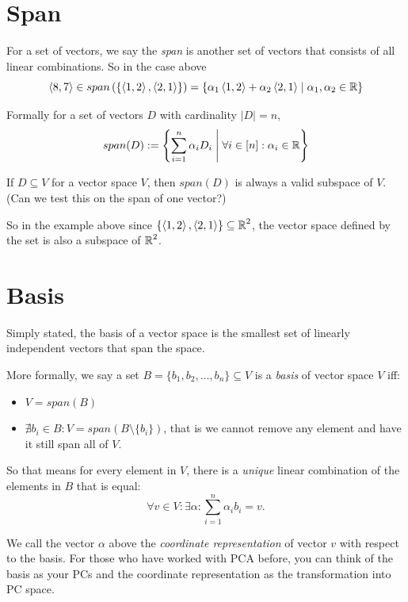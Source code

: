 \section{Span}
For a set of vectors, we say the \emph{span} is another set of vectors that consists of all linear combinations. 
So in the case above
\[
\left\langle8,7\right\rangle \in span\left(\left\{\left\langle1,2\right\rangle,\left\langle2,1\right\rangle\right\}\right) = 
\left\{\alpha_1\left\langle1,2\right\rangle + \alpha_2\left\langle2,1\right\rangle \;\middle|\; \alpha_1,\alpha_2 \in \operatorname{\mathbb{R}}\right\}
\]

Formally for a set of vectors $D$ with cardinality $\left|D\right|=n$, 
\[
span(D) := \left\{\sum_{i=1}^{n} \alpha_iD_i \;\middle|\; \forall i \in \left[n\right]: \alpha_i \in \operatorname{\mathbb{R}} \right\}
\]

If $D\subseteq V$ for a vector space $V$, then $span(D)$ is always a valid subspace of $V$. 
(Can we test this on the span of one vector?)

So in the example above since $\left\{\left\langle1,2\right\rangle,\left\langle2,1\right\rangle\right\}\subseteq\operatorname{\mathbb{R}}^2$,
the vector space defined by the set is also a subspace of $\operatorname{\mathbb{R}}^2$. 

\section{Basis}
Simply stated, the basis of a vector space is the smallest set of linearly independent vectors that span the space. 

More formally, we say a set $B=\{b_1,b_2,...,b_n\} \subseteq V$ is a \emph{basis} of vector space $V$ iff:
\begin{itemize}
\item $V = span(B)$
\item $\nexists b_i\in B : V = span(B\setminus\{b_i\})$, that is we cannot remove any element and have it still span all of $V$.
\end{itemize}

So that means for every element in $V$, there is a \textit{unique} linear combination of the elements in $B$ that is equal:
\[\forall v \in V : \exists \alpha : \sum_{i=1}^n \alpha_ib_i = v.\]

We call the vector $\alpha$ above the \emph{coordinate representation} of vector $v$ with respect to the basis. 
For those who have worked with PCA before, you can think of the basis as your PCs and the coordinate representation as the transformation into PC space. 

